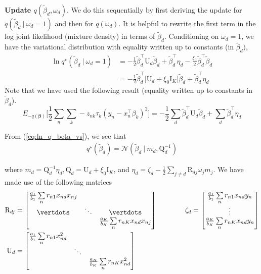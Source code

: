 \documentclass[twoside,11pt]{article}
\newcommand\given[1][]{\:#1\vert\:}
\newcommand{\transpose}[1]{#1^{\intercal}}
\newcommand{\nsum}{\sum\limits_{n}}
\newcommand{\ksum}{\sum\limits_{k}}
\newcommand{\boldbeta}{\boldsymbol\beta}
\newcommand{\betad}{\tilde{\beta}_d}
\newcommand{\umat}{\mathrm{U}}
\newcommand{\qmat}{\mathrm{Q}}
\begin{document}
\textbf{Update $q \left( \betad, \omega_d \right)$}. We do this sequentially by first deriving the update for $q\left(\betad \given \omega_d = 1 \right)$ and then for $q\left( \omega_d \right)$. It is helpful to rewrite the first term in the log joint likelihood (mixture density) in terms of $\betad$. Conditioning on $\omega_d = 1$, we have the variational distribution with equality written up to constants (in $\betad)$, 
\begin{align}
	 \ln q^{\star} \left(\betad \given \omega_d = 1 \right) &= - \frac{1}{2} \transpose{\betad} \umat_d \betad + \transpose{\betad} \eta_d - \frac{\xi_0}{2} \transpose{\betad} \betad \\
	 &= - \frac{1}{2} \transpose{\betad} \big[ \umat_d +  \xi_0 \mathrm{I}_K\big] \betad + \transpose{\betad} \eta_d \label{eq:ln_q_beta_vs}
\end{align}
Note that we have used the following result (equality written up to constants in $\betad$). 
\begin{equation}
	 E_{-q(\boldbeta)} \Bigg[ \frac{1}{2} \nsum \ksum -z_{nk} \tau_k \left( y_n - \transpose{x_n} \beta_k \right)^2 \Bigg] = - \frac{1}{2} \sum_d \transpose{\betad} \umat_d \betad + \sum_{d} \transpose{\betad} \eta_d
\end{equation}

From (\ref{eq:ln_q_beta_vs}), we see that
\begin{align*}
	q^{\star}\left(\betad\right) = \mathcal{N} \left( \betad \given m_d, \qmat_d^{-1} \right)
\end{align*}

where $m_d = \qmat_d^{-1} \eta_d, \qmat_d = \umat_d + \xi_0 \mathrm{I}_K$, and $\eta_d = \zeta_d - \frac{1}{2} \sum\limits_{j \neq d} \mathrm{R}_{dj} \omega_j m_j$. We have made use of the following matrices
\begin{align*}
\mathrm{R}_{dj} & = \begin{bmatrix} 
\frac{a_1}{b_1} \nsum r_{n1} x_{nd}x_{nj}           &          &          \\ 
\vertdots   &  \ddots    & \vertdots \\
            &          & \frac{a_K}{b_K} \nsum r_{nK} x_{nd}x_{nj}        \\
\end{bmatrix} \quad \quad \quad \quad
\zeta_d =  \begin{bmatrix} 
\frac{a_1}{b_1} \nsum r_{n1} x_{nd}y_{n} \\ 
\vdots   \\
\frac{a_K}{b_K} \nsum r_{nK} x_{nd}y_{n} \\
\end{bmatrix} \\
\umat_d & = \begin{bmatrix} 
\frac{a_1}{b_1} \nsum r_{n1} x_{nd}^2            &               &  \\ 
            &  \ddots       &  \\
            &               & \frac{a_K}{b_K} \nsum r_{nK} x_{nd}^2 \\
\end{bmatrix}
\end{align*}
\end{document}
